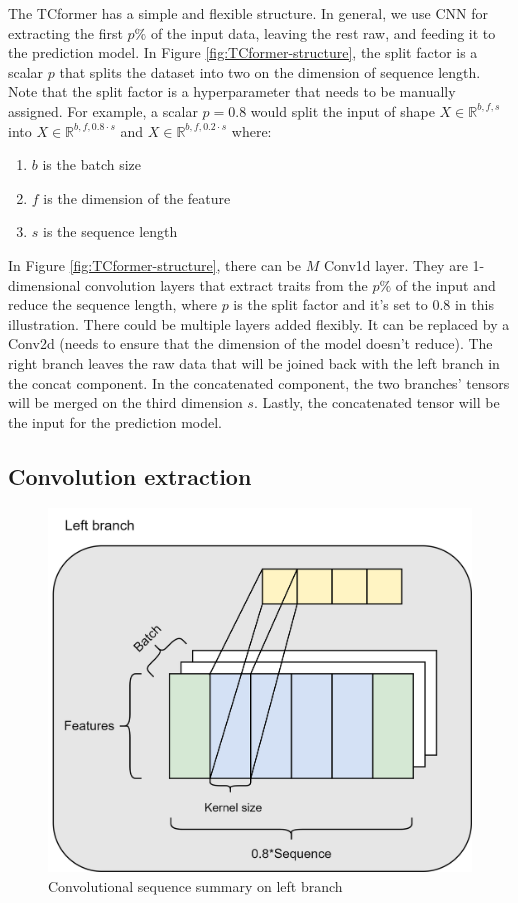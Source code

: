 \documentclass[stu,12pt,floatsintext]{apa7}
\begin{document}
The TCformer has a simple and flexible structure. In general, we use CNN for extracting the first $p\%$ of the input data, leaving the rest raw, and feeding it to the prediction model. In Figure \ref{fig:TCformer-structure}, the split factor is a scalar $p$ that splits the dataset into two on the dimension of sequence length. Note that the split factor is a hyperparameter that needs to be manually assigned. For example, a scalar $p=0.8$ would split the input of shape $X\in \mathbb{R}^{b,f,s}$ into $X\in \mathbb{R}^{b,f,0.8\cdot s}$ and $X\in \mathbb{R}^{b,f,0.2\cdot s}$ where:

\begin{enumerate}
    \item $b$ is the batch size
    \item $f$ is the dimension of the feature
    \item $s$ is the sequence length
\end{enumerate}

In Figure \ref{fig:TCformer-structure}, there can be $M$ Conv1d layer. They are 1-dimensional convolution layers that extract traits from the $p\%$ of the input and reduce the sequence length, where $p$ is the split factor and it's set to $0.8$ in this illustration. There could be multiple layers added flexibly. It can be replaced by a Conv2d (needs to ensure that the dimension of the model doesn't reduce). The right branch leaves the raw data that will be joined back with the left branch in the concat component. In the concatenated component, the two branches' tensors will be merged on the third dimension $s$. Lastly, the concatenated tensor will be the input for the prediction model. 

\subsection{Convolution extraction}

\begin{figure}[H]
    \centering
    \includegraphics[width=0.7\linewidth]{images/Left branch.png}
    \caption{Convolutional sequence summary on left branch}
    \label{fig:convolutional-operation}
\end{figure}
\end{document}
